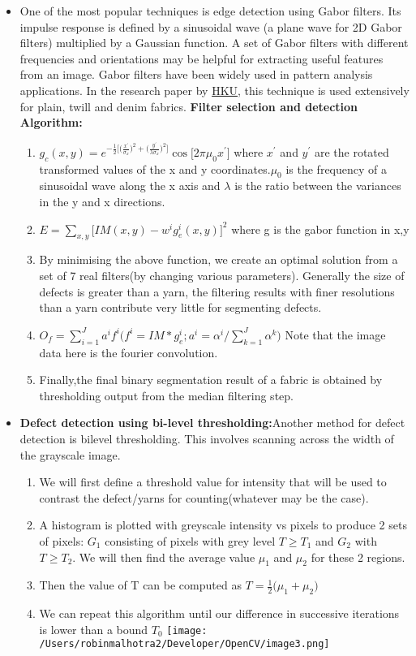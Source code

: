 \documentclass[DIV=calc, paper=a4, fontsize=12pt, twocolumn]{scrartcl}	 %
\begin{document}
\begin{itemize}
\item One of the most popular techniques is edge detection using Gabor filters. Its impulse response is defined by a sinusoidal wave (a plane wave for 2D Gabor filters) multiplied by a Gaussian function. A set of Gabor filters with different frequencies and orientations may be helpful for extracting useful features from an image. Gabor filters have been widely used in pattern analysis applications. In the research paper by \href{http://hub.hku.hk/bitstream/10722/46561/1/131190.pdf}{HKU}, this technique is used extensively for plain, twill and denim fabrics.  
\textbf{Filter selection and detection Algorithm:}
\begin{enumerate}
\item $g_c(x,y)=e^{-\frac{1}{2} \big[ \big(\frac{ x^{'}}{\sigma_x} \big)^2 +  \big(\frac{ y^{'}}{\lambda \sigma_x} \big)^2 \big]} \cos \big[2\pi \mu_0 x^{'}\big]$
where   $x^{'}$ and  $y^{'}$ are the rotated transformed values of the x and y coordinates.$ \mu_0$ is the frequency of a sinusoidal wave along the x axis and $\lambda$ is the ratio between the variances in the y and x directions.
\item $E=\sum_{x,y}\big[ IM(x,y)-w^{i}g_{e}^{i}(x,y) \big]^{2}$
where g is the gabor function in x,y 
 \item By minimising the above function, we create an optimal solution from a set of 7 real filters(by changing various parameters). Generally the size of defects is greater than a yarn, the filtering results with finer resolutions than a yarn contribute very little for segmenting defects.
\item $O_f=\sum_{i=1}^{J} a^i f^i \big( f^i= IM*g_e^i ; a^i=\alpha^i / \sum_{k=1}^{J} \alpha^k \big)$
Note that the image data here is the fourier convolution.
\item Finally,the final binary segmentation result of a fabric is obtained by thresholding output from  the median filtering step.

\end{enumerate}

\item \textbf{Defect detection using bi-level thresholding:}Another method for defect detection is bilevel thresholding. This involves scanning across the width  of the grayscale image.
\begin{enumerate}
\item We will first define a threshold value for intensity that will be used to contrast the defect/yarns for counting(whatever may be the case).  
\item A histogram is plotted with greyscale intensity vs pixels to produce 2 sets of pixels: $G_1$ consisting of pixels with grey level $T\geq T_1$ and $G_2$ with $T\geq T_2$. We will then find the average value $\mu_1$ and $\mu_2$ for these 2 regions.
\item Then the value of T can be computed as $T=\frac{1}{2} \big( \mu_1 + \mu_2 \big)$  
\item We can repeat this algorithm until our difference in successive iterations is lower than a bound $T_0$
\texttt{[image: /Users/robinmalhotra2/Developer/OpenCV/image3.png]}


\end{enumerate}
\end{itemize}
\end{document}

